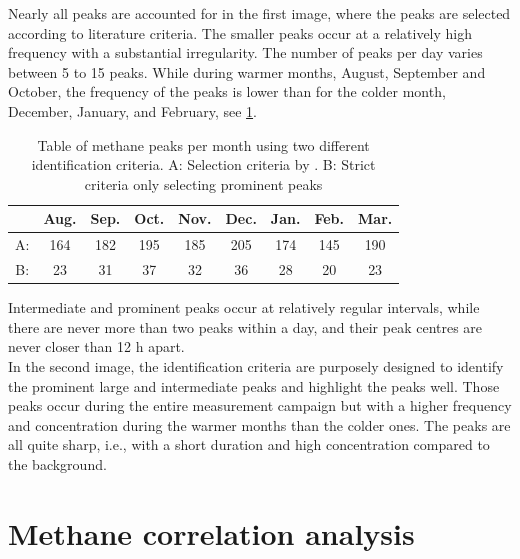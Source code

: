 Nearly all peaks are accounted for in the first image, where the peaks are selected according to literature criteria. The smaller peaks occur at a relatively high frequency with a substantial irregularity. The number of peaks per day varies between 5 to 15 peaks. While during warmer months, August, September and October, the frequency of the peaks is lower than for the colder month, December, January, and February, see \cref{PeakHistogramm}.
\begin{table}[h!]
\centering
\begin{tabular}{||c c c c c c c c c||} 
 \hline
 & Aug. & Sep. & Oct. & Nov. & Dec. & Jan. & Feb. & Mar. \\ [0.5ex] 
 \hline\hline
  A: & 164 & 182 & 195 & 185 & 205 & 174 & 145 & 190 \\
  B: & 23 & 31 & 37 & 32 & 36 & 28 & 20 & 23 \\ [1ex] 
 \hline
\end{tabular}
\caption[Methane peaks per moth table]{Table of methane peaks per month using two different identification criteria. A: Selection criteria by \cite{Menoud.2021}. B: Strict criteria only selecting prominent peaks}
\label{PeakHistogramm}
\end{table}
Intermediate and prominent peaks occur at relatively regular intervals, while there are never more than two peaks within a day, and their peak centres are never closer than 12 h apart. \\
In the second image, the identification criteria are purposely designed to identify the prominent large and intermediate peaks and highlight the peaks well. Those peaks occur during the entire measurement campaign but with a higher frequency and concentration during the warmer months than the colder ones. The peaks are all quite sharp, i.e., with a short duration and high concentration compared to the background.

\section{Methane correlation analysis}
